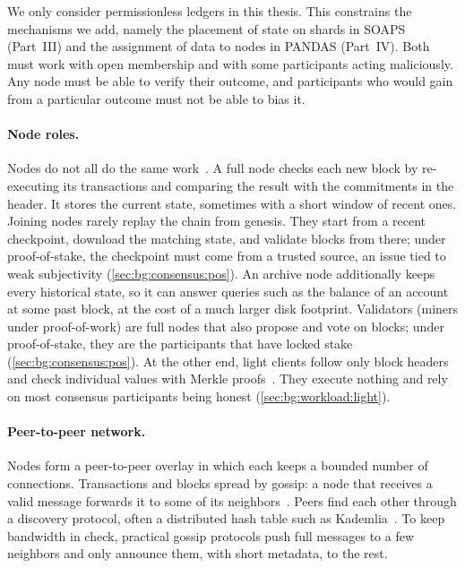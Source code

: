 We only consider permissionless ledgers in this thesis.
This constrains the mechanisms we add, namely the placement of state on shards in SOAPS (Part~III) and the assignment of data to nodes in PANDAS (Part~IV).
Both must work with open membership and with some participants acting maliciously.
Any node must be able to verify their outcome, and participants who would gain from a particular outcome must not be able to bias it.

\paragraph{Node roles.}
Nodes do not all do the same work~\cite{chatzigiannis2022sok}.
A full node checks each new block by re-executing its transactions and comparing the result with the commitments in the header.
It stores the current state, sometimes with a short window of recent ones.
Joining nodes rarely replay the chain from genesis.
They start from a recent checkpoint, download the matching state, and validate blocks from there; under proof-of-stake, the checkpoint must come from a trusted source, an issue tied to weak subjectivity (\autoref{sec:bg:consensus:pos}).
An archive node additionally keeps every historical state, so it can answer queries such as the balance of an account at some past block, at the cost of a much larger disk footprint.
Validators (miners under proof-of-work) are full nodes that also propose and vote on blocks; under proof-of-stake, they are the participants that have locked stake (\autoref{sec:bg:consensus:pos}).
At the other end, light clients follow only block headers and check individual values with Merkle proofs~\cite{chatzigiannis2022sok}.
They execute nothing and rely on most consensus participants being honest (\autoref{sec:bg:workload:light}).

\paragraph{Peer-to-peer network.}
Nodes form a peer-to-peer overlay in which each keeps a bounded number of connections.
Transactions and blocks spread by gossip: a node that receives a valid message forwards it to some of its neighbors~\cite{demers1987epidemic}.
Peers find each other through a discovery protocol, often a distributed hash table such as Kademlia~\cite{maymounkov2002kademlia}.
To keep bandwidth in check, practical gossip protocols push full messages to a few neighbors and only announce them, with short metadata, to the rest.

